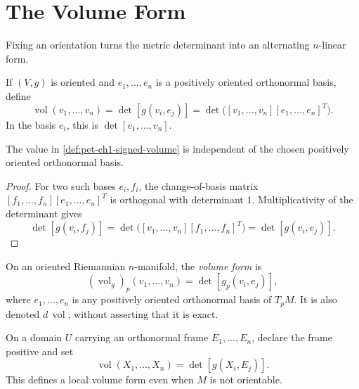\section{The Volume Form}

Fixing an orientation turns the metric determinant into an alternating
$n$-linear form.

\begin{definition}
  \label{def:pet-ch1-signed-volume}
  \leanok
  If $(V,g)$ is oriented and $e_1,\ldots,e_n$ is a positively oriented
  orthonormal basis, define
  \[
    \operatorname{vol}(v_1,\ldots,v_n)
      =\det[g(v_i,e_j)]
      =\det\big([v_1,\ldots,v_n][e_1,\ldots,e_n]^T\big).
  \]
  In the basis $e_i$, this is $\det[v_1,\ldots,v_n]$.
\end{definition}

\begin{proposition}
  \label{prop:pet-ch1-signed-volume-basis-independent}
  \leanok
  The value in \cref{def:pet-ch1-signed-volume} is independent of the chosen
  positively oriented orthonormal basis.
\end{proposition}
\begin{proof}
  \leanok
  \sketch
  For two such bases $e_i,f_i$, the change-of-basis matrix
  $[f_1,\ldots,f_n][e_1,\ldots,e_n]^T$ is orthogonal with determinant $1$.
  Multiplicativity of the determinant gives
  \[
    \det[g(v_i,f_j)]
      =\det\big([v_1,\ldots,v_n][f_1,\ldots,f_n]^T\big)
      =\det[g(v_i,e_j)].
  \]
\end{proof}

\begin{definition}
  \label{def:pet-ch1-volume-form-oriented}
  \leanok
  On an oriented Riemannian $n$-manifold, the \emph{volume form} is
  \[
    (\operatorname{vol}_g)_p(v_1,\ldots,v_n)=\det[g_p(v_i,e_j)],
  \]
  where $e_1,\ldots,e_n$ is any positively oriented orthonormal basis of
  $T_pM$. It is also denoted $d\,\operatorname{vol}$, without asserting that
  it is exact.
\end{definition}

\begin{definition}
  \label{def:pet-ch1-volume-form-local}
  \leanok
  On a domain $U$ carrying an orthonormal frame $E_1,\ldots,E_n$, declare the
  frame positive and set
  \[
    \operatorname{vol}(X_1,\ldots,X_n)=\det[g(X_i,E_j)].
  \]
  This defines a local volume form even when $M$ is not orientable.
\end{definition}

